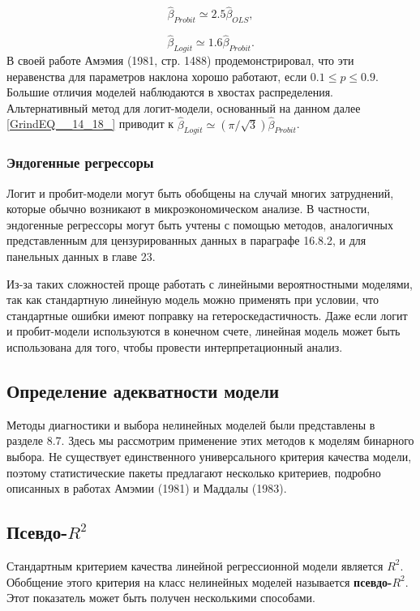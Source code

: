 \[
\widehat\beta_{Probit} \simeq 2.5 \widehat\beta_{OLS}, 
\] 

\[
\widehat\beta_{Logit} \simeq 1.6 \widehat\beta_{Probit}.
\] 
В своей работе Амэмия (1981,  стр. 1488) продемонстрировал,  что эти неравенства для параметров наклона хорошо работают,  если $0.1 \le p \le 0.9$. Большие отличия моделей наблюдаются в хвостах распределения. Альтернативный метод для логит-модели,  основанный на данном далее \eqref{GrindEQ__14_18_} приводит к $\widehat\beta_{Logit} \simeq (\pi/\sqrt{3}) \widehat\beta_{Probit}$.

\subsubsection*{Эндогенные регрессоры}

Логит и пробит-модели могут быть обобщены на случай многих затруднений,  которые обычно возникают в микроэкономическом анализе. В частности,  эндогенные регрессоры могут быть учтены с помощью  методов,  аналогичных представленным для цензурированных данных в параграфе 16.8.2,  и для панельных данных в главе 23.

Из-за таких сложностей проще работать с линейными вероятностными моделями, так как стандартную линейную модель  можно применять при условии, что стандартные ошибки имеют поправку на гетероскедастичность. Даже если логит и пробит-модели используются в конечном счете, линейная модель может быть использована для того, чтобы провести интерпретационный анализ.

\subsection{Определение адекватности модели}

Методы диагностики и выбора нелинейных моделей были представлены в разделе 8.7. Здесь мы рассмотрим применение этих методов к моделям бинарного выбора. Не существует единственного универсального критерия  качества модели,  поэтому статистические пакеты предлагают несколько критериев,  подробно описанных в работах Амэмии  (1981)  и Маддалы (1983).

\subsection*{Псевдо-$R^2$}

Стандартным критерием качества линейной регрессионной модели является $R^2$. Обобщение этого критерия на класс нелинейных моделей называется \textbf{псевдо-}$R^2$. Этот показатель может быть получен несколькими способами.

